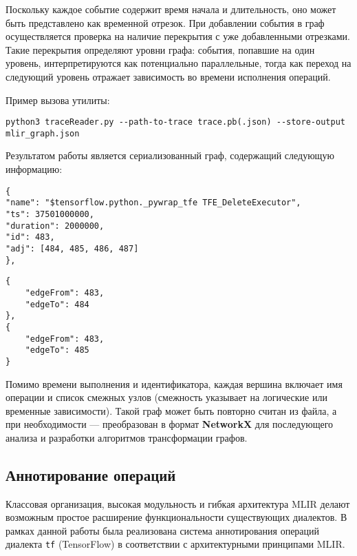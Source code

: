 Поскольку каждое событие содержит время начала и длительность, оно может быть представлено как временной отрезок.
При добавлении события в граф осуществляется проверка на наличие перекрытия с уже добавленными отрезками.
Такие перекрытия определяют уровни графа: события, попавшие на один уровень, интерпретируются как потенциально параллельные, тогда как переход на следующий уровень отражает зависимость во времени исполнения операций.

Пример вызова утилиты:

\begin{lstlisting}[caption={Пример использования программы traceReader.py}]
python3 traceReader.py --path-to-trace trace.pb(.json) --store-output mlir_graph.json
\end{lstlisting}

Результатом работы является сериализованный граф, содержащий следующую информацию:

\noindent
\begin{minipage}{0.48\textwidth}
\begin{lstlisting}[caption={Формат вершины MLIR-графа}]
{
"name": "$tensorflow.python._pywrap_tfe TFE_DeleteExecutor",
"ts": 37501000000,
"duration": 2000000,
"id": 483,
"adj": [484, 485, 486, 487]
},
\end{lstlisting}
\end{minipage}\hfill
\begin{minipage}{0.48\textwidth}
\begin{lstlisting}[caption={Формат ребра MLIR-графа}]
{
    "edgeFrom": 483,
    "edgeTo": 484
},
{
    "edgeFrom": 483,
    "edgeTo": 485
}
\end{lstlisting}
\end{minipage}

Помимо времени выполнения и идентификатора, каждая вершина включает имя операции и список смежных узлов (смежность указывает на логические или временные зависимости).
Такой граф может быть повторно считан из файла, а при необходимости — преобразован в формат \textbf{NetworkX} для последующего анализа и разработки алгоритмов трансформации графов.

\subsection{Аннотирование операций}

Классовая организация, высокая модульность и гибкая архитектура MLIR делают возможным простое расширение функциональности существующих диалектов. В рамках данной работы была реализована система аннотирования операций диалекта \texttt{tf} (TensorFlow) в соответствии с архитектурными принципами MLIR.

